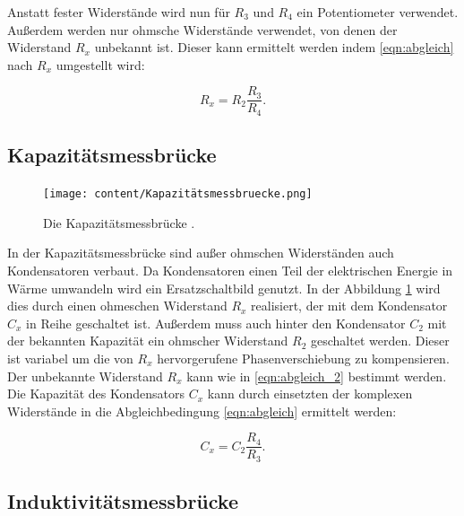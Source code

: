 Anstatt fester Widerstände wird nun für $R_3$ und $R_4$ ein Potentiometer verwendet.
Außerdem werden nur ohmsche Widerstände verwendet, von denen der Widerstand $R_x$ unbekannt ist.
Dieser kann ermittelt werden indem \eqref{eqn:abgleich} nach $R_x$ umgestellt wird:

\begin{equation}
    R_x = R_2 \frac{R_3}{R_4}.
    \label{eqn:abgleich_2}
\end{equation}

\subsection{Kapazitätsmessbrücke}

\begin{figure}
    \centering
    \texttt{[image: content/Kapazitätsmessbruecke.png]}
    \caption{Die Kapazitätsmessbrücke \cite[S. 220]{anleitung}.}
     \label{fig:kapaz}
\end{figure}

In der Kapazitätsmessbrücke sind außer ohmschen Widerständen auch Kondensatoren verbaut.
Da Kondensatoren einen Teil der elektrischen Energie in Wärme umwandeln wird ein Ersatzschaltbild genutzt.
In der Abbildung \ref{fig:kapaz} wird dies durch einen ohmeschen Widerstand $R_x$ realisiert, der mit dem Kondensator $C_x$ in Reihe geschaltet ist.
Außerdem muss auch hinter den Kondensator $C_2$ mit der bekannten Kapazität ein ohmscher Widerstand $R_2$ geschaltet werden.
Dieser ist variabel um die von $R_x$ hervorgerufene Phasenverschiebung zu kompensieren.
Der unbekannte Widerstand $R_x$ kann wie in \eqref{eqn:abgleich_2} bestimmt werden.
Die Kapazität des Kondensators $C_x$ kann durch einsetzten der komplexen Widerstände in die
Abgleichbedingung \eqref{eqn:abgleich} ermittelt werden:

\begin{equation}
    C_x = C_2 \frac{R_4}{R_3}.
    \label{eqn:kapc}
\end{equation}

\subsection{Induktivitätsmessbrücke}

